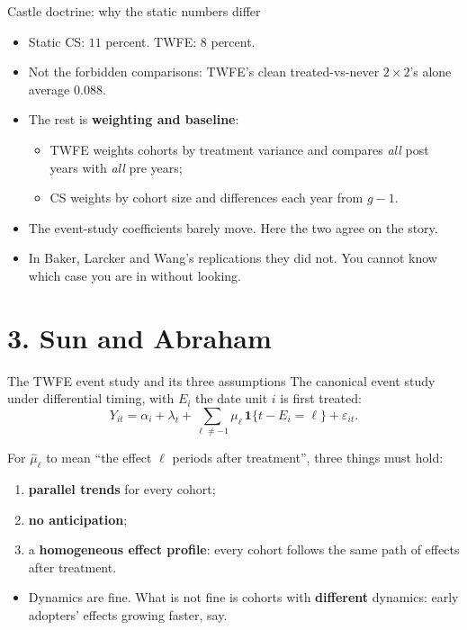 \documentclass[
  11pt,
  ignorenonframetext,
  aspectratio=169,
]{beamer}
\providecommand{\tightlist}{%
  \setlength{\itemsep}{0pt}\setlength{\parskip}{0pt}}
\begin{document}
\begin{frame}{Castle doctrine: why the static numbers differ}
\protect{}\label{castle-doctrine-why-the-static-numbers-differ}
\begin{itemize}
\tightlist
\item
  Static CS: \(11\) percent. TWFE: \(8\) percent.
\item
  Not the forbidden comparisons: TWFE's clean treated-vs-never
  \(2 \times 2\)'s alone average \(0.088\).
\item
  The rest is \textbf{weighting and baseline}:

  \begin{itemize}
  \tightlist
  \item
    TWFE weights cohorts by treatment variance and compares \emph{all}
    post years with \emph{all} pre years;
  \item
    CS weights by cohort size and differences each year from \(g - 1\).
  \end{itemize}
\item
  The event-study coefficients barely move. Here the two agree on the
  story.
\item
  In Baker, Larcker and Wang's replications they did not. You cannot
  know which case you are in without looking.
\end{itemize}
\end{frame}

\section{3. Sun and Abraham}\label{sun-and-abraham}

\begin{frame}{The TWFE event study and its three assumptions}
\protect{}\label{the-twfe-event-study-and-its-three-assumptions}
The canonical event study under differential timing, with \(E_i\) the
date unit \(i\) is first treated: \[
Y_{it} = \alpha_i + \lambda_t + \sum_{\ell \ne -1}\mu_\ell\,\mathbf{1}\{t - E_i = \ell\} + \varepsilon_{it}.
\]

For \(\hat\mu_\ell\) to mean ``the effect \(\ell\) periods after
treatment'', three things must hold:

\begin{enumerate}
\tightlist
\item
  \textbf{parallel trends} for every cohort;
\item
  \textbf{no anticipation};
\item
  a \textbf{homogeneous effect profile}: every cohort follows the same
  path of effects after treatment.
\end{enumerate}

\begin{itemize}
\tightlist
\item
  Dynamics are fine. What is not fine is cohorts with \textbf{different}
  dynamics: early adopters' effects growing faster, say.
\end{itemize}
\end{frame}
\end{document}

